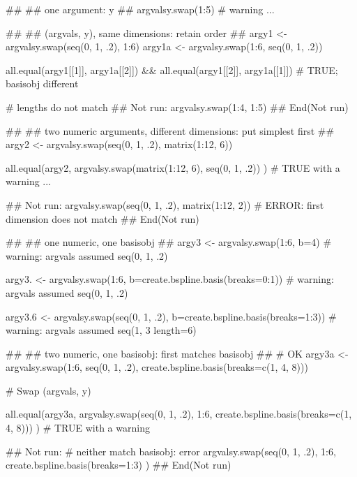 \documentclass{article}
\begin{document}
\begin{Examples}
\begin{ExampleCode}
##
## one argument:  y
##
argvalsy.swap(1:5)
# warning ... 

##
## (argvals, y), same dimensions:  retain order 
##
argy1 <- argvalsy.swap(seq(0, 1, .2), 1:6)
argy1a <- argvalsy.swap(1:6, seq(0, 1, .2))


all.equal(argy1[[1]], argy1a[[2]]) &&
all.equal(argy1[[2]], argy1a[[1]])
# TRUE;  basisobj different 


# lengths do not match 
## Not run: 
argvalsy.swap(1:4, 1:5)
## End(Not run) 

##
## two numeric arguments, different dimensions:  put simplest first 
##
argy2 <- argvalsy.swap(seq(0, 1, .2), matrix(1:12, 6))


all.equal(argy2,
argvalsy.swap(matrix(1:12, 6), seq(0, 1, .2)) )
# TRUE with a warning ... 


## Not run: 
argvalsy.swap(seq(0, 1, .2), matrix(1:12, 2))
# ERROR:  first dimension does not match 
## End(Not run)

##
## one numeric, one basisobj
##
argy3 <- argvalsy.swap(1:6, b=4)
# warning:  argvals assumed seq(0, 1, .2) 

argy3. <- argvalsy.swap(1:6, b=create.bspline.basis(breaks=0:1))
# warning:  argvals assumed seq(0, 1, .2) 

argy3.6 <- argvalsy.swap(seq(0, 1, .2), b=create.bspline.basis(breaks=1:3))
# warning:  argvals assumed seq(1, 3 length=6)

##
## two numeric, one basisobj:  first matches basisobj
##
#  OK 
argy3a <- argvalsy.swap(1:6, seq(0, 1, .2),
              create.bspline.basis(breaks=c(1, 4, 8))) 

#  Swap (argvals, y) 

all.equal(argy3a,
argvalsy.swap(seq(0, 1, .2), 1:6, 
              create.bspline.basis(breaks=c(1, 4, 8))) )
# TRUE with a warning 


## Not run: 
# neither match basisobj:  error  
argvalsy.swap(seq(0, 1, .2), 1:6, 
              create.bspline.basis(breaks=1:3) ) 
## End(Not run)

\end{ExampleCode}
\end{Examples}
\end{document}
